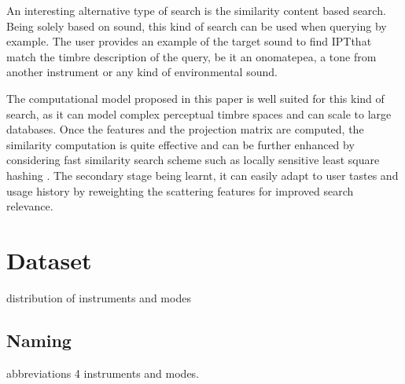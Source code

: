 \documentclass{article}
\newcommand{\ipt}{IPT}
\begin{document}
An interesting alternative type of search is the similarity content based search. Being solely based on sound, this kind of search can be used when querying by example. The user provides an example of the target sound to find \ipt that match the timbre description of the query, be it an onomatepea, a tone from another instrument or any kind of environmental sound.

The computational model proposed in this paper is well suited for this kind of search, as it can model complex perceptual timbre spaces and can scale to large databases. Once the features and the projection matrix are computed, the similarity computation is quite effective and can be further enhanced by considering fast similarity search scheme such as locally sensitive least square hashing \cite{lsh}. The secondary stage being learnt, it can easily adapt to user tastes and usage history by reweighting the scattering features for improved search relevance.



\section{Dataset}

distribution of instruments and modes

\subsection{Naming}

abbreviations 4 instruments and modes.



%
%
%
%
\end{document}
